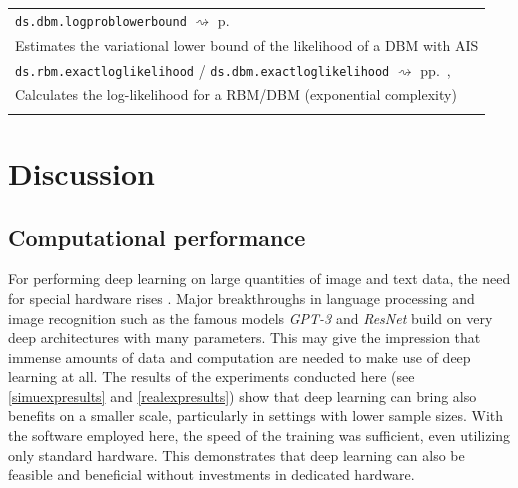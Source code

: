 \documentclass[12pt]{article}
\newcommand{\inlinecode}[1]{\texttt{#1}}
\newcommand{\apkg}[1]{\emph{#1}}
\newcommand{\rightpageref}[1]{\hfill $\rightsquigarrow$ p.\ \pageref{#1}}
\newcommand{\rightpagerefs}[2]{\hfill $\rightsquigarrow$ pp.\ \pageref{#1}, \pageref{#2}}
\begin{document}
\begin{table}[!htb]
\begin{tabularx}{\textwidth}{X}
\inlinecode{ds.dbm.logproblowerbound} \rightpageref{rdokitem_ds.dbm.logproblowerbound} \\
Estimates the variational lower bound of the likelihood of a DBM with AIS \\
\inlinecode{ds.rbm.exactloglikelihood} /
\inlinecode{ds.dbm.exactloglikelihood} \rightpagerefs{rdokitem_ds.dbm.exactloglikelihood}{rdokitem_ds.rbm.exactloglikelihood} \\
Calculates the log-likelihood for a RBM/DBM (exponential complexity)\\
   \Xhline{1pt}
\end{tabularx}
\end{table}



\clearpage
\FloatBarrier

\section{Discussion}

\subsection{Computational performance}
For performing deep learning on large quantities of image and text data, the need for special hardware rises \citep{lecun_dlhardware}.
Major breakthroughs in language processing and image recognition such as the famous models {\em GPT-3} and \citep{gpt3} {\em ResNet} \citep{resnet} build on very deep architectures with many parameters.
This may give the impression that immense amounts of data and computation are needed to make use of deep learning at all.
The results of the experiments conducted here (see \ref{simuexpresults} and \ref{realexpresults}) show that deep learning can bring also benefits on a smaller scale, particularly in settings with lower sample sizes.
With the software employed here, the speed of the training was sufficient, even utilizing only standard hardware.
This demonstrates that deep learning can also be feasible and beneficial without investments in dedicated hardware.
\end{document}
